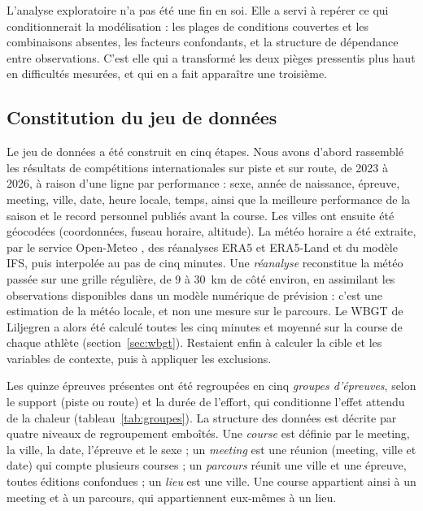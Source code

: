 \documentclass[11pt,a4paper]{article}
\begin{document}
L'analyse exploratoire n'a pas été une fin en soi. Elle a servi à repérer ce qui conditionnerait la modélisation :
les plages de conditions couvertes et les combinaisons absentes, les facteurs confondants, et la structure de
dépendance entre observations. C'est elle qui a transformé les deux pièges pressentis plus haut en difficultés
mesurées, et qui en a fait apparaître une troisième.

\subsection{Constitution du jeu de données}\label{sec:jeu}

Le jeu de données a été construit en cinq étapes. Nous avons d'abord rassemblé les résultats de compétitions
internationales sur piste et sur route, de 2023 à 2026, à raison d'une ligne par performance : sexe, année de
naissance, épreuve, meeting, ville, date, heure locale, temps, ainsi que la meilleure performance de la saison et le
record personnel publiés avant la course. Les villes ont ensuite été géocodées (coordonnées, fuseau horaire,
altitude). La météo horaire a été extraite, par le service Open-Meteo \citep{zippenfenig2023}, des réanalyses ERA5 \citep{hersbach2020} et ERA5-Land et du modèle IFS, puis interpolée au pas
de cinq minutes. Une \emph{réanalyse} reconstitue la météo passée sur une grille régulière, de 9 à 30~km de côté
environ, en assimilant les observations disponibles dans un modèle numérique de prévision : c'est une estimation de
la météo locale, et non une mesure sur le parcours. Le WBGT de Liljegren a alors été calculé toutes les cinq minutes
et moyenné sur la course de chaque athlète (section~\ref{sec:wbgt}). Restaient enfin à calculer la cible et les
variables de contexte, puis à appliquer les exclusions.

Les quinze épreuves présentes ont été regroupées en cinq \emph{groupes d'épreuves}, selon le support (piste ou route)
et la durée de l'effort, qui conditionne l'effet attendu de la chaleur (tableau~\ref{tab:groupes}). La structure des
données est décrite par quatre niveaux de regroupement emboîtés. Une \emph{course} est définie par le meeting, la
ville, la date, l'épreuve et le sexe ; un \emph{meeting} est une réunion (meeting, ville et date) qui compte
plusieurs courses ; un \emph{parcours} réunit une ville et une épreuve, toutes éditions confondues ; un \emph{lieu} est
une ville. Une course appartient ainsi à un meeting et à un parcours, qui appartiennent eux-mêmes à un lieu.
\end{document}

